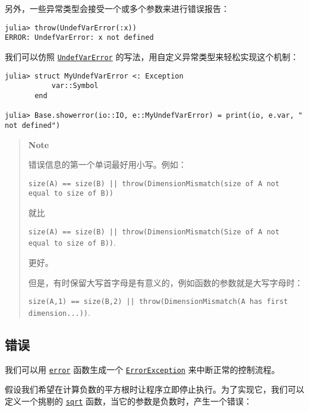 另外，一些异常类型会接受一个或多个参数来进行错误报告：




\begin{verbatim}
julia> throw(UndefVarError(:x))
ERROR: UndefVarError: x not defined
\end{verbatim}



我们可以仿照 \hyperlink{4452889246677411554}{\texttt{UndefVarError}} 的写法，用自定义异常类型来轻松实现这个机制：




\begin{verbatim}
julia> struct MyUndefVarError <: Exception
           var::Symbol
       end

julia> Base.showerror(io::IO, e::MyUndefVarError) = print(io, e.var, " not defined")
\end{verbatim}



\begin{quote}
\textbf{Note}

错误信息的第一个单词最好用小写。例如：

\texttt{size(A) == size(B) || throw(DimensionMismatch({\textquotedbl}size of A not equal to size of B{\textquotedbl}))}

就比

\texttt{size(A) == size(B) || throw(DimensionMismatch({\textquotedbl}Size of A not equal to size of B{\textquotedbl}))}.

更好。

但是，有时保留大写首字母是有意义的，例如函数的参数就是大写字母时：

\texttt{size(A,1) == size(B,2) || throw(DimensionMismatch({\textquotedbl}A has first dimension...{\textquotedbl}))}.

\end{quote}


\hypertarget{18278096073868016389}{}


\subsection{错误}



我们可以用 \hyperlink{17992125292605951734}{\texttt{error}} 函数生成一个 \hyperlink{12102596058483452470}{\texttt{ErrorException}} 来中断正常的控制流程。



假设我们希望在计算负数的平方根时让程序立即停止执行。为了实现它，我们可以定义一个挑剔的 \hyperlink{4551113327515323898}{\texttt{sqrt}} 函数，当它的参数是负数时，产生一个错误：




